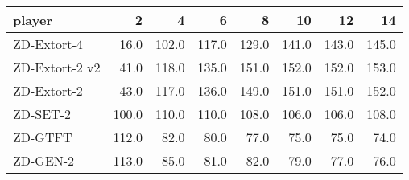 \begin{tabular}{lrrrrrrr}
\toprule
         player &      2 &      4 &      6 &      8 &     10 &     12 &     14 \\
\midrule
    ZD-Extort-4 &   16.0 &  102.0 &  117.0 &  129.0 &  141.0 &  143.0 &  145.0 \\
 ZD-Extort-2 v2 &   41.0 &  118.0 &  135.0 &  151.0 &  152.0 &  152.0 &  153.0 \\
    ZD-Extort-2 &   43.0 &  117.0 &  136.0 &  149.0 &  151.0 &  151.0 &  152.0 \\
       ZD-SET-2 &  100.0 &  110.0 &  110.0 &  108.0 &  106.0 &  106.0 &  108.0 \\
        ZD-GTFT &  112.0 &   82.0 &   80.0 &   77.0 &   75.0 &   75.0 &   74.0 \\
       ZD-GEN-2 &  113.0 &   85.0 &   81.0 &   82.0 &   79.0 &   77.0 &   76.0 \\
\bottomrule
\end{tabular}
